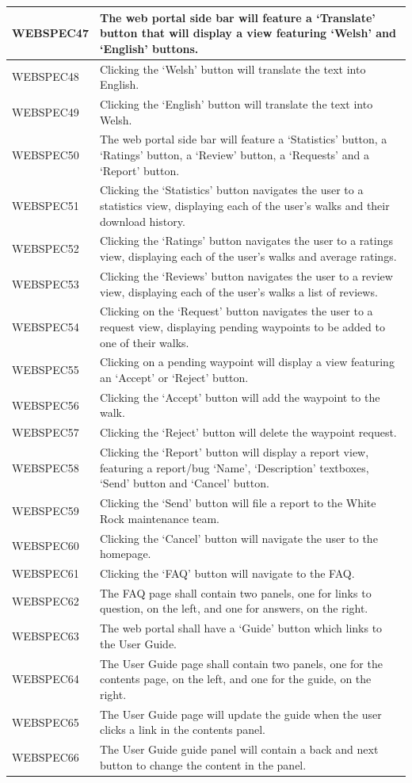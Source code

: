 \documentclass[11pt,a4paper]{article}
\begin{document}
\begin{longtable}{|p{2.5cm}p{13cm}|}
WEBSPEC47 & The web portal side bar will feature a `Translate' button that will display a view featuring `Welsh' and `English' buttons. \\ \hline
WEBSPEC48 & Clicking the `Welsh' button will translate the text into English. \\ \hline
WEBSPEC49 & Clicking the `English' button will translate the text into Welsh. \\ \hline
WEBSPEC50 & The web portal side bar will feature a `Statistics' button, a `Ratings' button, a `Review' button, a `Requests' and a `Report' button. \\ \hline
WEBSPEC51 & Clicking the `Statistics' button navigates the user to a statistics view, displaying each of the user's walks and their download history. \\ \hline
WEBSPEC52 & Clicking the `Ratings' button navigates the user to a ratings view, displaying each of the user's walks and average ratings. \\ \hline
WEBSPEC53 & Clicking the `Reviews' button navigates the user to a review view, displaying each of the user's walks a list of reviews. \\ \hline
WEBSPEC54 & Clicking on the `Request' button navigates the user to a request view, displaying pending waypoints to be added to one of their walks. \\ \hline
WEBSPEC55 & Clicking on a pending waypoint will display a view featuring an `Accept' or `Reject' button. \\ \hline
WEBSPEC56 & Clicking the `Accept' button will add the waypoint to the walk. \\ \hline
WEBSPEC57 & Clicking the `Reject' button will delete the waypoint request. \\ \hline
WEBSPEC58 & Clicking the `Report' button will display a report view, featuring a report/bug `Name', `Description' textboxes, `Send' button and `Cancel' button. \\ \hline
WEBSPEC59 & Clicking the `Send' button will file a report to the White Rock maintenance team. \\ \hline
WEBSPEC60 & Clicking the `Cancel' button will navigate the user to the homepage. \\ \hline
WEBSPEC61 & Clicking the `FAQ' button will navigate to the FAQ. \\ \hline
WEBSPEC62 & The FAQ page shall contain two panels, one for links to question, on the left, and one for answers, on the right. \\ \hline
WEBSPEC63 & The web portal shall have a `Guide' button which links to the User Guide. \\ \hline
WEBSPEC64 & The User Guide page shall contain two panels, one for the contents page, on the left, and one for the guide, on the right. \\ \hline
WEBSPEC65 & The User Guide page will update the guide when the user clicks a link in the contents panel.  \\ \hline
WEBSPEC66 & The User Guide guide panel will contain a back and next button to change the content in the panel. \\ \hline
\end{longtable}
\end{document}

